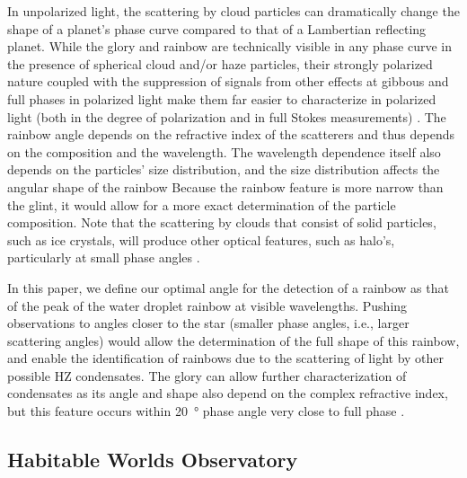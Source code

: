 \documentclass[
    usenatbib,
]{mnras}
\begin{document}
In unpolarized light, the scattering by cloud particles can dramatically change the shape of a planet's phase curve compared to that of a 
Lambertian reflecting planet.
%
{\color{red}{check the sentence:}}
While the glory and rainbow are technically visible in any phase curve
in the presence of spherical cloud and/or haze particles, their strongly polarized nature coupled with the suppression of signals from other effects at gibbous and full phases in polarized light make them far easier to characterize in polarized light (both in the degree of polarization and in full Stokes measurements) \citep{karalidi2011, stam2008, treesandstam2019}.
%
The rainbow angle depends on the refractive index of the scatterers and thus depends on the composition and the wavelength. 
The wavelength dependence itself also depends on the particles' size distribution, and the size distribution affects the angular shape of the rainbow \citep{karalidi2011}
%
Because the rainbow feature is more narrow than the glint, it would 
allow for a more exact determination of the particle composition.
%
Note that the scattering by clouds that consist of solid particles, 
such as ice crystals, will produce other optical features, such as halo's, particularly at small phase angles \citep{bailey2007, hansentravis1974, karalidi2012rainbow}.
%

In this paper, we define our optimal angle for the detection of a rainbow as that of the peak of the water droplet rainbow at visible wavelengths.
%
Pushing observations to angles closer to the star (smaller phase angles, i.e., larger scattering angles) would allow the determination of the full shape of this rainbow, and enable the identification of rainbows due to the scattering of light by other possible HZ condensates.
%
The glory 
can allow further characterization of condensates as its angle and shape also depend on the complex refractive index, but this feature occurs within \qty{20}{\degree} phase angle very close to full phase \citep{hansentravis1974}.
%

\subsection{Habitable Worlds Observatory}
\end{document}
